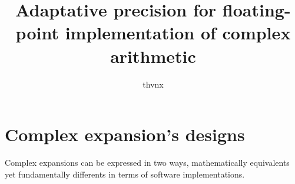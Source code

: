 \documentclass{neutron}
\title{Adaptative precision for floating-point implementation of complex arithmetic}
\author{thvnx}
\begin{document}
\maketitle

\section{Complex expansion's designs}

Complex expansions can be expressed in two ways, mathematically equivalents yet fundamentally differents in terms of software implementations.
\end{document}
